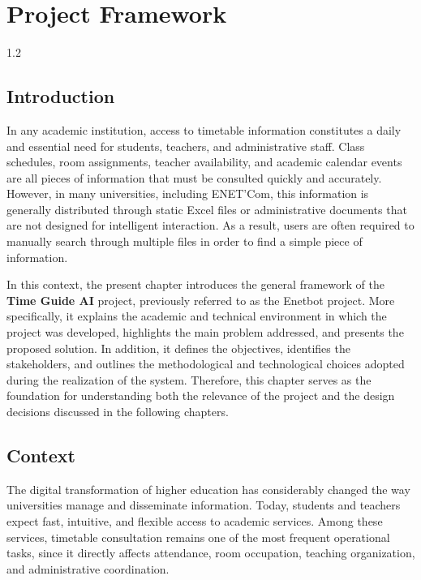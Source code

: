 \chapter{Project Framework}
\begin{spacing}{1.2}
\minitoc
\thispagestyle{MyStyle}
\end{spacing}
\newpage

\section{Introduction}
In any academic institution, access to timetable information constitutes a daily and essential need for students, teachers, and administrative staff. Class schedules, room assignments, teacher availability, and academic calendar events are all pieces of information that must be consulted quickly and accurately. However, in many universities, including ENET'Com, this information is generally distributed through static Excel files or administrative documents that are not designed for intelligent interaction. As a result, users are often required to manually search through multiple files in order to find a simple piece of information.

In this context, the present chapter introduces the general framework of the \textbf{Time Guide AI} project, previously referred to as the Enetbot project. More specifically, it explains the academic and technical environment in which the project was developed, highlights the main problem addressed, and presents the proposed solution. In addition, it defines the objectives, identifies the stakeholders, and outlines the methodological and technological choices adopted during the realization of the system. Therefore, this chapter serves as the foundation for understanding both the relevance of the project and the design decisions discussed in the following chapters.

\section{Context}
The digital transformation of higher education has considerably changed the way universities manage and disseminate information. Today, students and teachers expect fast, intuitive, and flexible access to academic services. Among these services, timetable consultation remains one of the most frequent operational tasks, since it directly affects attendance, room occupation, teaching organization, and administrative coordination.

